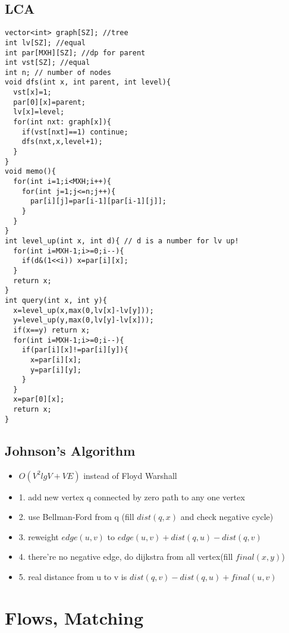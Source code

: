 \documentclass[landscape, 8pt, a4paper, oneside, twocolumn]{extarticle}
\begin{document}
\subsection{LCA}
\begin{verbatim}
vector<int> graph[SZ]; //tree
int lv[SZ]; //equal
int par[MXH][SZ]; //dp for parent
int vst[SZ]; //equal
int n; // number of nodes
void dfs(int x, int parent, int level){
  vst[x]=1;
  par[0][x]=parent;
  lv[x]=level;
  for(int nxt: graph[x]){
    if(vst[nxt]==1) continue;
    dfs(nxt,x,level+1);
  }
}
void memo(){
  for(int i=1;i<MXH;i++){
    for(int j=1;j<=n;j++){
      par[i][j]=par[i-1][par[i-1][j]];
    }
  }
}
int level_up(int x, int d){ // d is a number for lv up!
  for(int i=MXH-1;i>=0;i--){
    if(d&(1<<i)) x=par[i][x];
  }
  return x;
}
int query(int x, int y){
  x=level_up(x,max(0,lv[x]-lv[y])); 
  y=level_up(y,max(0,lv[y]-lv[x]));
  if(x==y) return x;
  for(int i=MXH-1;i>=0;i--){
    if(par[i][x]!=par[i][y]){
      x=par[i][x];
      y=par[i][y];
    }
  }
  x=par[0][x];
  return x;
}
\end{verbatim}

\subsection{Johnson's Algorithm}
\begin{itemize}
    \item $ O(V ^ {2} lg V + VE) $ instead of Floyd Warshall
    \item 1. add new vertex q connected by zero path to any one vertex 
    \item 2. use Bellman-Ford from q (fill $ dist(q,x) $ and check negative cycle)
    \item 3. reweight $ edge(u,v) $ to $ edge(u,v) + dist(q,u) - dist(q,v) $
    \item 4. there're no negative edge, do dijkstra from all vertex(fill $ final(x,y) $)
    \item 5. real distance from u to v is $ dist(q,v) - dist(q,u) + final(u,v) $    
\end{itemize}

\section{Flows, Matching}
\end{document}
